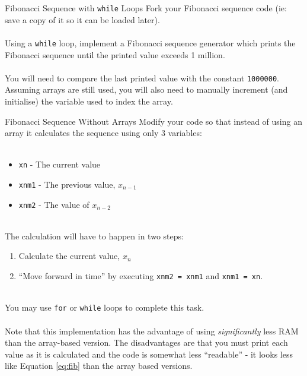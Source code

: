 \documentclass{lab}
\begin{document}
\begin{task}{Fibonacci Sequence with \texttt{while} Loops}{}
Fork your Fibonacci sequence code (ie: save a copy of it so it can be loaded later).
\\~\\
Using a \texttt{while} loop, implement a Fibonacci sequence generator which prints the Fibonacci sequence until the printed value exceeds 1 million.
\\~\\
You will need to compare the last printed value with the constant \texttt{1000000}. Assuming arrays are still used, you will also need to manually increment (and initialise) the variable used to index the array.
\end{task}

\begin{task}{Fibonacci Sequence Without Arrays}{}
Modify your code so that instead of using an array it calculates the sequence using only 3 variables:
\\~
\begin{itemize}
\item \texttt{xn} - The current value
\item \texttt{xnm1} - The previous value, $x_{n-1}$
\item \texttt{xnm2} - The value of $x_{n-2}$
\end{itemize}
~\\
The calculation will have to happen in two steps:
\\
\begin{enumerate}
\item Calculate the current value, $x_n$
\item ``Move forward in time'' by executing \texttt{xnm2 = xnm1} and \texttt{xnm1 = xn}.
\end{enumerate}
~\\
You may use \texttt{for} or \texttt{while} loops to complete this task.
\\~\\
Note that this implementation has the advantage of using \textit{significantly} less RAM than the array-based version. The disadvantages are that you must print each value as it is calculated and the code is somewhat less ``readable'' - it looks less like Equation \ref{eq:fib} than the array based versions.
\end{task}
\end{document}
